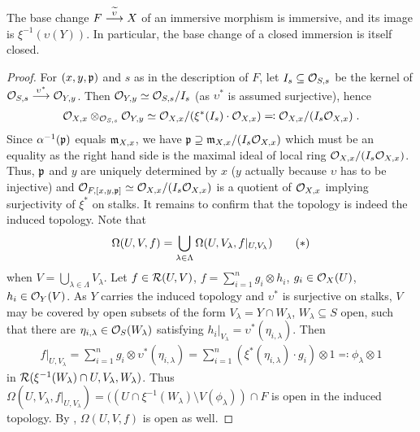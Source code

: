 \documentclass[a4paper,parskip=half,numbers=enddot, DIV=12]{scrreprt}
\begin{document}
\begin{cor}
    The base change $F\morphism[\snake \upsilon] X$ of an immersive morphism is immersive, and its image is $\xi^{-1}(\upsilon(Y))$. In particular, the base change of a closed immersion is itself closed.
\end{cor}
\begin{proof}
    For $(x,y,\mathfrak{p})$ and $s$ as in the description of $F$, let $I_s\subseteq \mathcal{O}_{S,s}$ be the kernel of $\Oo_{S,s}\morphism[\upsilon^*] \Oo_{Y,y}$. Then $\mathcal{O}_{Y,y}\simeq \mathcal{O}_{S,s}/I_s$ (as $\upsilon^*$ is assumed surjective), hence 
    \begin{align*}
    	\mathcal{O}_{X,x}\otimes_{\mathcal{O}_{S,s}}\mathcal{O}_{Y,y} \simeq \mathcal{O}_{X,x}/(\xi^*(I_s) \cdot \mathcal{O}_{X,x}) \eqqcolon \mathcal{O}_{X,x}/(I_s\mathcal{O}_{X,x})\;. 
    \end{align*}
    Since $\alpha^{-1}(\mathfrak{p})$ equals $\mathfrak{m}_{X,x}$, we have $\mathfrak{p}\supseteq \mathfrak{m}_{X,x}/(I_s \mathcal{O}_{X,x})$ which must be an equality as the right hand side is the maximal ideal of local ring $\mathcal{O}_{X,x}/(I_s \mathcal{O}_{X,x})$. Thus, $\mathfrak{p}$ and $y$ are uniquely determined by $x$ ($y$ actually because $\upsilon$ has to be injective) and $\mathcal{O}_{F,[x,y,\mathfrak{p}]}\simeq \mathcal{O}_{X,x}/(I_s \mathcal{O}_{X,x})$ is a quotient of $\mathcal{O}_{X,x}$ implying surjectivity of $\xi^*$ on stalks. It remains to confirm that the topology is indeed the induced topology. Note that
    \begin{align}\lbl{eq:omegaCover}
        \Omega(U,V,f) = \bigcup_{\lambda\in \Lambda} \Omega(U,V_\lambda, f|_{U,V_\lambda})\tag{$*$}
    \end{align}
    when $V=\bigcup_{\lambda\in \Lambda} V_\lambda$. Let $f\in \mathcal{R}(U,V)$, $f=\sum_{i=1}^n g_i\otimes h_i$, $g_i\in \mathcal{O}_X(U)$, $h_i\in\mathcal{O}_Y(V)$. As $Y$ carries the induced topology and $\upsilon^*$ is surjective on stalks, $V$ may be covered by open subsets of the form $V_\lambda = Y\cap W_\lambda$, $W_\lambda \subseteq S$ open, such that there are $\eta_{i,\lambda}\in \mathcal{O}_S(W_\lambda)$ satisfying $h_i|_{V_\lambda} = \upsilon^*(\eta_{i,\lambda})$. Then
    \begin{align*}
        f|_{U,V_\lambda} = \sum_{i=1}^n g_i\otimes \upsilon^*(\eta_{i,\lambda}) = \sum_{i=1}^n (\xi^*(\eta_{i,\lambda})\cdot g_i) \otimes 1 \eqqcolon\phi_\lambda\otimes 1
    \end{align*}
    in $\mathcal{R}(\xi^{-1}(W_\lambda)\cap U, V_\lambda, W_\lambda)$. Thus $\Omega(U,V_\lambda, f|_{U,V_\lambda}) = ((U\cap \xi^{-1}(W_\lambda)\setminus V(\phi_\lambda))\cap F$ is open in the induced topology. By , $\Omega(U,V,f)$ is open as well.
\end{proof}
\end{document}

